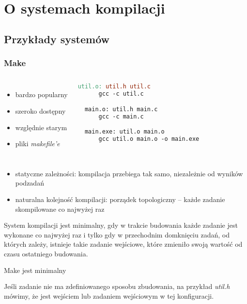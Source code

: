 
\section{O systemach kompilacji}

\subsection{Przykłady systemów}

\begin{frame}[fragile]
  \frametitle{Make}
  \begin{columns}[t]
    \begin{itemize}
    \item bardzo popularny
    \item szeroko dostępny
    \item względnie starym
    \item pliki \textit{makefile'e}
    \end{itemize}

    \begin{lstlisting}[language=make, basicstyle=\scriptsize\ttfamily]
  util.o: util.h util.c
      gcc -c util.c

  main.o: util.h main.c
      gcc -c main.c

  main.exe: util.o main.o
      gcc util.o main.o -o main.exe
    \end{lstlisting}
  \end{columns}
  \begin{itemize}
  \item statyczne zależności: kompilacja przebiega tak samo, niezależnie od wyników podzadań
  \item naturalna kolejność kompilacji: porządek topologiczny -- każde zadanie skompilowane co najwyżej raz
  \end{itemize}
\end{frame}

\begin{frame}
  \begin{definition}[Minimalność]
    System kompilacji jest minimalny, gdy w trakcie budowania każde zadanie jest wykonane co najwyżej raz i tylko gdy w przechodnim domknięciu zadań, od których zależy, istnieje takie zadanie wejściowe, które zmieniło swoją wartość od czasu ostatniego budowania.
  \end{definition}
  \pause
  \begin{example}
    Make jest minimalny
  \end{example}
  \pause
  \begin{definition}
     Jeśli zadanie nie ma zdefiniowanego sposobu zbudowania, na przykład \textit{util.h} mówimy, że jest wejściem lub zadaniem wejściowym w tej konfiguracji.
  \end{definition}
\end{frame}

